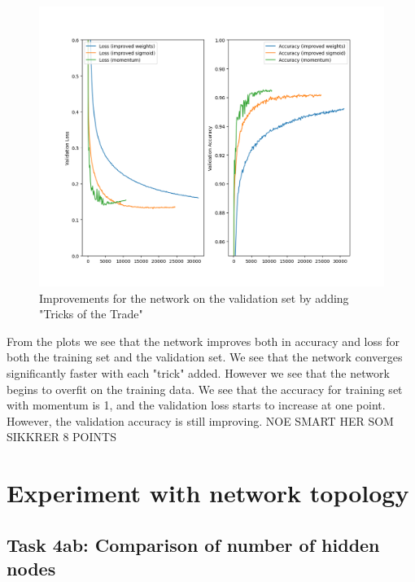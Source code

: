 \documentclass{article}
\begin{document}
\begin{figure}[H]
    \centering
    \includegraphics[width=\textwidth]{Assignments/Assignment_2/plots/task3/task3_validation.png}
    \caption{Improvements for the network on the validation set by adding "Tricks of the Trade"}
    \label{fig:task3_val}
\end{figure}

From the plots we see that the network improves both in accuracy and loss for both the training set and the validation set. We see that the network converges significantly faster with each "trick" added. However we see that the network begins to overfit on the training data. We see that the accuracy for training set with momentum is 1, and the validation loss starts to increase at one point. However, the validation accuracy is still improving. NOE SMART HER SOM SIKKRER 8 POINTS 

\section{Experiment with network topology}

\subsection{Task 4ab: Comparison of number of hidden nodes}
\end{document}
